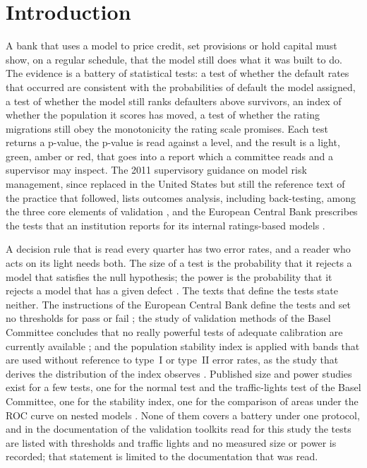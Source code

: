 \section{Introduction}
\label{sec:introduction}

A bank that uses a model to price credit, set provisions or hold capital must show, on a regular schedule, that the model still does what it was built to do.
The evidence is a battery of statistical tests: a test of whether the default rates that occurred are consistent with the probabilities of default the model assigned, a test of whether the model still ranks defaulters above survivors, an index of whether the population it scores has moved, a test of whether the rating migrations still obey the monotonicity the rating scale promises.
Each test returns a p-value, the p-value is read against a level, and the result is a light, green, amber or red, that goes into a report which a committee reads and a supervisor may inspect.
The 2011 supervisory guidance on model risk management, since replaced in the United States but still the reference text of the practice that followed, lists outcomes analysis, including back-testing, among the three core elements of validation \citep{fed2011sr117}, and the European Central Bank prescribes the tests that an institution reports for its internal ratings-based models \citep{ecb2019instructions}.

A decision rule that is read every quarter has two error rates, and a reader who acts on its light needs both.
The size of a test is the probability that it rejects a model that satisfies the null hypothesis; the power is the probability that it rejects a model that has a given defect \citep{neymanpearson1933}.
The texts that define the tests state neither.
The instructions of the European Central Bank define the tests and set no thresholds for pass or fail \citep{ecb2019instructions}; the study of validation methods of the Basel Committee concludes that no really powerful tests of adequate calibration are currently available \citep{bcbswp14}; and the population stability index is applied with bands that are used without reference to type~I or type~II error rates, as the study that derives the distribution of the index observes \citep{yurdakul2020}.
Published size and power studies exist for a few tests, one for the normal test and the traffic-lights test of the Basel Committee, one for the stability index, one for the comparison of areas under the ROC curve on nested models \citep{bcbswp14,yurdakul2020,demler2012}.
None of them covers a battery under one protocol, and in the documentation of the validation toolkits read for this study the tests are listed with thresholds and traffic lights and no measured size or power is recorded; that statement is limited to the documentation that was read.

